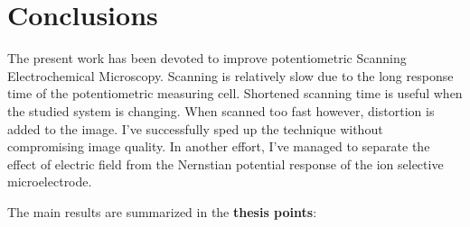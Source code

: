 \section{Conclusions}
The present work has been devoted to improve potentiometric Scanning Electrochemical Microscopy.
Scanning is relatively slow due to the long response time of the potentiometric measuring cell.
Shortened scanning time is useful when the studied system is changing.
When scanned too fast however, distortion is added to the image.
I've successfully sped up the technique without compromising image quality.
In another effort, I've managed to separate the effect of electric field from the Nernstian potential response of the ion selective microelectrode. 

The main results are summarized in the \textbf{thesis points}:

